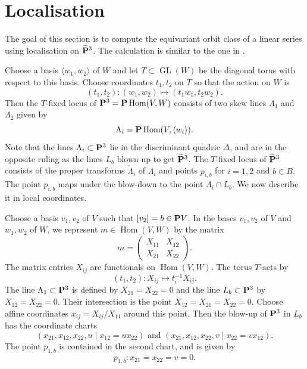 \documentclass[11pt]{amsart}
\renewcommand {\P}{{\bf P}}
\providecommand{\GL}{\operatorname{GL}}
\providecommand{\Hom}{\operatorname{Hom}}
\begin{document}
\section{Localisation}\label{sec:localisation}
The goal of this section is to compute the equivariant orbit class of a linear series using localisation on \(\widetilde{\P}^{3}\).
The calculation is similar to the one in \cite[Appendix~B]{lee.pat.tse:19}.

Choose a basis \(\langle  w_{1}, w_{2} \rangle\) of \(W\) and let \(T \subset \GL(W)\) be the diagonal torus with respect to this basis.
Choose coordinates \(t_{1}, t_{2}\) on \(T\) so that the action on \(W\) is
\[ (t_{1},t_{2}) \colon (w_{1}, w_{2}) \mapsto (t_{1}w_{1}, t_{2}w_{2}).\]
Then the \(T\)-fixed locus of \(\P^{3} = \P \Hom(V,W)\) consists of two skew lines \(\Lambda_{1}\) and \(\Lambda_{2}\) given by
\[ \Lambda_i = \P \Hom(V, \langle w_{i}\rangle).\]
Note that the lines \(\Lambda_{i} \subset \P^{3}\) lie in the discriminant quadric \(\Delta\), and are in the opposite ruling as the lines \(L_{b}\) blown up to get \(\widetilde{\P}^{3}\).
The \(T\)-fixed locus of \(\widetilde{\P}^{3}\) consists of the proper transforms \(\widetilde{\Lambda}_{i}\) of \(\Lambda_{i}\) and points \(p_{i,b}\) for \(i = 1,2\) and \(b \in B\).
The point \(p_{i,b}\) maps under the blow-down to the point \(\Lambda_{i} \cap L_{b}\).
We now describe it in local coordinates.

Choose a basis \(v_{1}, v_{2}\) of \(V\) such that \([v_{2}] = b \in \P V\).
In the bases \(v_{1}, v_{2}\) of \(V\) and \(w_{1}, w_{2}\) of \(W\), we represent \(m \in \Hom(V, W)\) by the matrix
\[
  m = \begin{pmatrix}
    X_{11} & X_{12} \\
    X_{21} & X_{22}
  \end{pmatrix}.
\]
The matrix entries \(X_{ij}\) are functionals on \(\Hom(V, W)\).
The torus \(T\)-acts by
\[ (t_{1},t_{2}) \colon X_{ij} \mapsto t_{i}^{-1}X_{ij}.\]
The line \(\Lambda_{1} \subset \P^{3}\) is defined by \(X_{21} = X_{22} = 0\) and the line \(L_b \subset \P^3\) by \(X_{12} = X_{22} = 0.\)
Their intersection is the point \(X_{12} = X_{21} = X_{22} = 0\).
Choose affine coordinates \(x_{ij} = X_{ij}/X_{11}\) around this point.
Then the blow-up of \(\P^3\) in \(L_{b}\) has the coordinate charts
\[ (x_{21},x_{12},x_{22},u \mid x_{12}=ux_{22}) \text{ and } (x_{21},x_{12},x_{22}, v \mid x_{22}=vx_{12}).\]
The point \(p_{1,b}\) is contained in the second chart, and is given by
\begin{equation}\label{eq:p}
  p_{1,b}: x_{21} = x_{22} = v = 0.
\end{equation}
\end{document}
